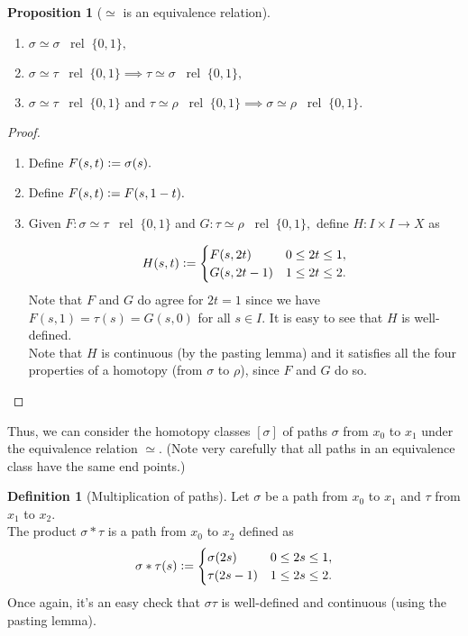 \documentclass[12pt]{article}
\theoremstyle{definition}
\numberwithin{thm}{section}
\newtheorem{defn}[thm]{Definition}
\newtheorem{prop}[thm]{Proposition}
\newcommand{\rel}{\;\;\operatorname{rel}\;}
\begin{document}
\begin{prop}[$\simeq$ is an equivalence relation] \label{prop:equivrel}
	\phantom{hi}\\
	\begin{enumerate}
		\item $\sigma \simeq \sigma \rel \{0, 1\},$
		\item $\sigma \simeq \tau \rel \{0, 1\} \implies \tau \simeq \sigma \rel \{0, 1\},$
		\item $\sigma \simeq \tau \rel \{0, 1\}$ and $\tau \simeq \rho \rel \{0, 1\} \implies \sigma \simeq \rho \rel \{0, 1\}.$ 
	\end{enumerate}
\end{prop}
\begin{proof} 
	\begin{enumerate}
		\item Define $F(s, t) \vcentcolon= \sigma(s).$
		\item Define $F(s, t) \vcentcolon= F(s, 1 - t).$
		\item Given $F:\sigma \simeq \tau \rel \{0, 1\}$ and $G:\tau \simeq \rho \rel \{0, 1\},$ define $H:I \times I \to X$ as

		\begin{equation*} 
			H(s, t) \vcentcolon= \begin{cases}
				F(s, 2t) & 0 \le 2t \le 1,\\
				G(s, 2t - 1) & 1 \le 2t \le 2.
			\end{cases}
		\end{equation*}
		Note that $F$ and $G$ do agree for $2t = 1$ since we have $F(s, 1) = \tau(s) = G(s, 0)$ for all $s \in I.$ It is easy to see that $H$ is well-defined.\\
		Note that $H$ is continuous (by the pasting lemma) and it satisfies all the four properties of a homotopy (from $\sigma$ to $\rho$), since $F$ and $G$ do so. \qedhere
	\end{enumerate}
\end{proof}
Thus, we can consider the homotopy classes $[\sigma]$ of paths $\sigma$ from $x_0$ to $x_1$ under the equivalence relation $\simeq.$ (Note very carefully that all paths in an equivalence class have the same end points.)

\begin{defn}[Multiplication of paths]
	Let $\sigma$ be a path from $x_0$ to $x_1$ and $\tau$ from $x_1$ to $x_2.$\\
	The product $\sigma*\tau$ is a path from $x_0$ to $x_2$ defined as
	\begin{equation*} 
		\sigma*\tau(s) \vcentcolon= \begin{cases}
			\sigma(2s) & 0 \le 2s \le 1,\\
			\tau(2s - 1) & 1 \le 2s \le 2.
		\end{cases}
	\end{equation*}
	Once again, it's an easy check that $\sigma\tau$ is well-defined and continuous (using the pasting lemma).
\end{defn}
\end{document}
